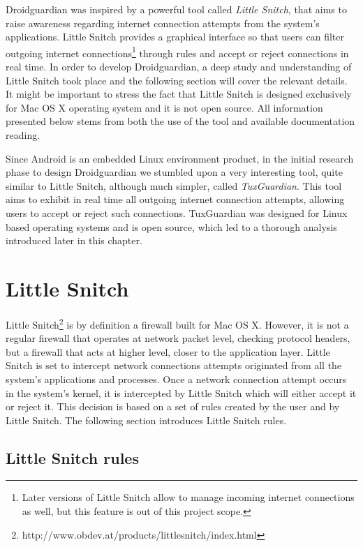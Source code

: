 
Droidguardian was inspired by a powerful tool called \textit{Little Snitch}, that aims to raise awareness regarding internet connection attempts from the system's applications. Little Snitch provides a graphical interface so that users can filter outgoing internet connections\footnote{Later versions of Little Snitch allow to manage incoming internet connections as well, but this feature is out of this project scope.} through rules and accept or reject connections in real time. In order to develop Droidguardian, a deep study and understanding of Little Snitch took place and the following section will cover the relevant details. It might be important to stress the fact that Little Snitch is designed exclusively for Mac OS X operating system and it is not open source. All information presented below stems from both the use of the tool and available documentation reading.

Since Android is an embedded Linux environment product, in the initial research phase to design Droidguardian we stumbled upon a very interesting tool, quite similar to Little Snitch, although much simpler, called \textit{TuxGuardian}. This tool aims to exhibit in real time all outgoing internet connection attempts, allowing users to accept or reject such connections. TuxGuardian was designed for Linux based operating systems and is open source, which led to a thorough analysis introduced later in this chapter.

\section{Little Snitch}
\label{sec:little_snitch}

Little Snitch\footnote{http://www.obdev.at/products/littlesnitch/index.html} is by definition a firewall built for Mac OS X. However, it is not a regular firewall that operates at network packet level, checking protocol headers, but a firewall that acts at higher level, closer to the application layer. Little Snitch is set to intercept network connections attempts originated from all the system's applications and processes. Once a network connection attempt occurs in the system's kernel, it is intercepted by Little Snitch which will either accept it or reject it. This decision is based on a set of rules created by the user and by Little Snitch. The following section introduces Little Snitch rules.

\subsection{Little Snitch rules}

